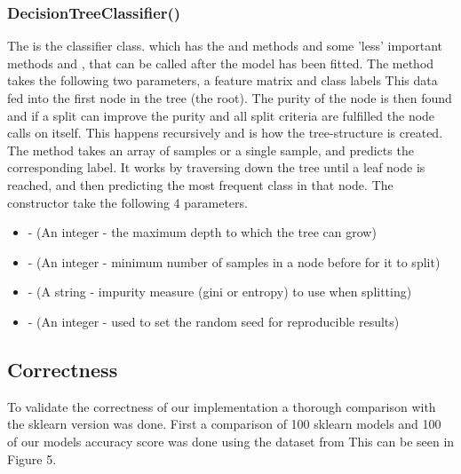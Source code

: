 \subsubsection{DecisionTreeClassifier()}
The  is the classifier class.
which has the  and  methods and some 'less' important
methods  and , that can be called after the model has been fitted.
The  method takes the following two parameters, a feature matrix  and class labels 
This data fed into the first node in the tree (the root).
The purity of the node is then found and if a split can improve the purity and all split criteria are fulfilled the node calls  on itself.
This happens recursively and is how the tree-structure is created.
The  method takes an array of samples or a single sample, and predicts the corresponding label.
It works by traversing down the tree until a leaf node is reached, and then predicting the most frequent class in that node.
The constructor take the following 4 parameters.\\
\begin{itemize}
    \item {} - (An integer - the maximum depth to which the tree can grow)
    \item {} - (An integer - minimum number of samples in a node before for it to split)
    \item {} - (A string - impurity measure (gini or entropy) to use when splitting)
    \item {} - (An integer - used to set the random seed for reproducible results)
    \end{itemize}
\vspace{10pt}

\subsection{Correctness}
To validate the correctness of our implementation a thorough comparison with the sklearn version was done.
First a comparison of 100 sklearn models and 100 of our models accuracy score was done using the  dataset from 
This can be seen in Figure 5.\\

